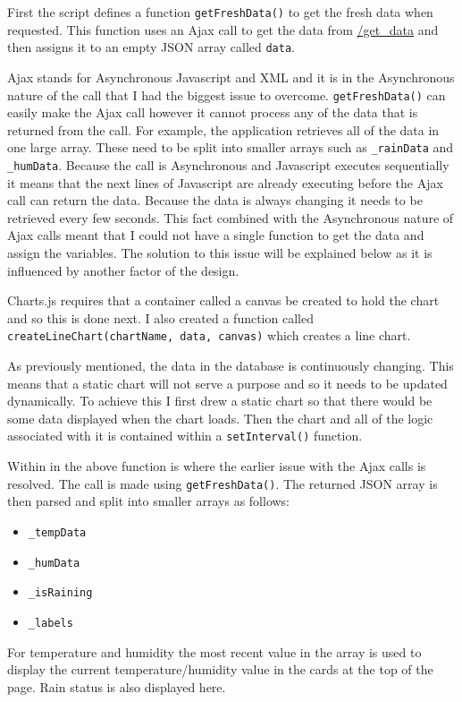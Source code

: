 \documentclass[10pt,a4paper]{article}
\begin{document}
First the script defines a function \texttt{getFreshData()} to get the fresh data when requested. This function uses an Ajax call to get the data from \url{/get_data} and then assigns it to an empty JSON array called \texttt{data}. 

Ajax stands for Asynchronous Javascript and XML and it is in the Asynchronous nature of the call that I had the biggest issue to overcome. \texttt{getFreshData()} can easily make the Ajax call however it cannot process any of the data that is returned from the call. For example, the application retrieves all of the data in one large array. These need to be split into smaller arrays such as \texttt{\_rainData} and \texttt{\_humData}. Because the call is Asynchronous and Javascript executes sequentially it means that the next lines of Javascript are already executing before the Ajax call can return the data. Because the data is always changing it needs to be retrieved every few seconds. This fact combined with the Asynchronous nature of Ajax calls meant that I could not have a single function to get the data and assign the variables. The solution to this issue will be explained below as it is influenced by another factor of the design. 

Charts.js requires that a container called a canvas be created to hold the chart and so this is done next. I also created a function called  \texttt{createLineChart(chartName, data, canvas)} which creates a line chart. 

As previously mentioned, the data in the database is continuously changing. This means that a static chart will not serve a purpose and so it needs to be updated dynamically. To achieve this I first drew a static chart so that there would be some data displayed when the chart loads. Then the chart and all of the logic associated with it is contained within a \texttt{setInterval()} function. 

Within in the above function is where the earlier issue with the Ajax calls is resolved. The call is made using \texttt{getFreshData()}. The returned JSON array is then parsed and split into smaller arrays as follows: 
\begin{itemize}
\item \texttt{\_tempData}
\item \texttt{\_humData}
\item \texttt{\_isRaining}
\item \texttt{\_labels}
\end{itemize}

For temperature and humidity the most recent value in the array is used to display the current temperature/humidity value in the cards at the top of the page. Rain status is also displayed here. 
\end{document}
